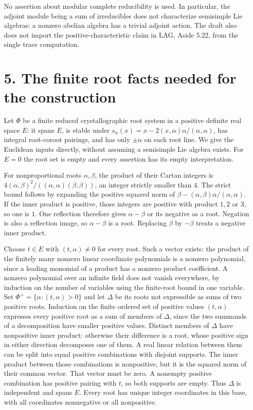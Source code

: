 \documentclass[11pt,a4paper,openany]{report}
\newcounter{none}
\begin{document}
No assertion about modular complete reducibility is used. In particular, the adjoint module being a sum of irreducibles does not characterize semisimple Lie algebras: a nonzero abelian algebra has a trivial adjoint action. The draft also does not import the positive-characteristic claim in LAG, Aside 5.22, from the single trace computation.

\section{5. The finite root facts needed for the construction}\label{AG-RG-S06-the-finite-root-facts-needed-for-the-construction}

Let \(\Phi\) be a finite reduced crystallographic root system in a positive definite real space \(E\): it spans \(E\), is stable under \(s_\alpha(x)=x-2(x,\alpha)\alpha/(\alpha,\alpha)\), has integral root-coroot pairings, and has only \(\pm\alpha\) on each root line. We give the Euclidean inputs directly, without assuming a semisimple Lie algebra exists. For \(E=0\) the root set is empty and every assertion has its empty interpretation.

For nonproportional roots \(\alpha,\beta\), the product of their Cartan integers is \(4(\alpha,\beta)^2/((\alpha,\alpha)(\beta,\beta))\), an integer strictly smaller than \(4\). The strict bound follows by expanding the positive squared norm of \(\beta-(\alpha,\beta)\alpha/(\alpha,\alpha)\). If the inner product is positive, those integers are positive with product \(1,2\) or \(3\), so one is \(1\). One reflection therefore gives \(\alpha-\beta\) or its negative as a root. Negation is also a reflection image, so \(\alpha-\beta\) is a root. Replacing \(\beta\) by \(-\beta\) treats a negative inner product.

Choose \(t\in E\) with \((t,\alpha)\ne0\) for every root. Such a vector exists: the product of the finitely many nonzero linear coordinate polynomials is a nonzero polynomial, since a leading monomial of a product has a nonzero product coefficient. A nonzero polynomial over an infinite field does not vanish everywhere, by induction on the number of variables using the finite-root bound in one variable. Set \(\Phi^+=\{\alpha:(t,\alpha)>0\}\) and let \(\Delta\) be its roots not expressible as sums of two positive roots. Induction on the finite ordered set of positive values \((t,\alpha)\) expresses every positive root as a sum of members of \(\Delta\), since the two summands of a decomposition have smaller positive values. Distinct members of \(\Delta\) have nonpositive inner product: otherwise their difference is a root, whose positive sign in either direction decomposes one of them. A real linear relation between them can be split into equal positive combinations with disjoint supports. The inner product between those combinations is nonpositive, but it is the squared norm of their common vector. That vector must be zero. A nonempty positive combination has positive pairing with \(t\), so both supports are empty. Thus \(\Delta\) is independent and spans \(E\). Every root has unique integer coordinates in this base, with all coordinates nonnegative or all nonpositive.
\end{document}
